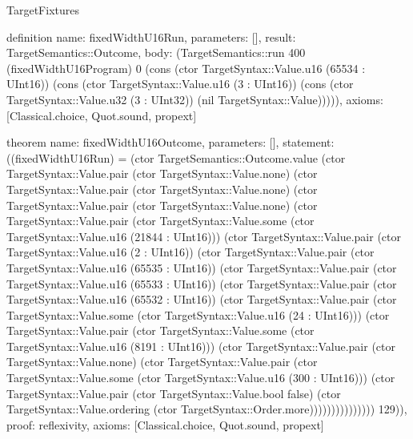 \begin{lexlean}{TargetFixtures}
\begin{semanticmodule}
definition{
  name: fixedWidthU16Run,
  parameters: [],
  result: TargetSemantics::Outcome,
  body: (TargetSemantics::run 400 (fixedWidthU16Program) 0 (cons (ctor TargetSyntax::Value.u16 (65534 : UInt16)) (cons (ctor TargetSyntax::Value.u16 (3 : UInt16)) (cons (ctor TargetSyntax::Value.u32 (3 : UInt32)) (nil TargetSyntax::Value))))),
  axioms: [Classical.choice, Quot.sound, propext]
}

theorem{
  name: fixedWidthU16Outcome,
  parameters: [],
  statement: ((fixedWidthU16Run) = (ctor TargetSemantics::Outcome.value (ctor TargetSyntax::Value.pair (ctor TargetSyntax::Value.none) (ctor TargetSyntax::Value.pair (ctor TargetSyntax::Value.none) (ctor TargetSyntax::Value.pair (ctor TargetSyntax::Value.none) (ctor TargetSyntax::Value.pair (ctor TargetSyntax::Value.some (ctor TargetSyntax::Value.u16 (21844 : UInt16))) (ctor TargetSyntax::Value.pair (ctor TargetSyntax::Value.u16 (2 : UInt16)) (ctor TargetSyntax::Value.pair (ctor TargetSyntax::Value.u16 (65535 : UInt16)) (ctor TargetSyntax::Value.pair (ctor TargetSyntax::Value.u16 (65533 : UInt16)) (ctor TargetSyntax::Value.pair (ctor TargetSyntax::Value.u16 (65532 : UInt16)) (ctor TargetSyntax::Value.pair (ctor TargetSyntax::Value.some (ctor TargetSyntax::Value.u16 (24 : UInt16))) (ctor TargetSyntax::Value.pair (ctor TargetSyntax::Value.some (ctor TargetSyntax::Value.u16 (8191 : UInt16))) (ctor TargetSyntax::Value.pair (ctor TargetSyntax::Value.none) (ctor TargetSyntax::Value.pair (ctor TargetSyntax::Value.some (ctor TargetSyntax::Value.u16 (300 : UInt16))) (ctor TargetSyntax::Value.pair (ctor TargetSyntax::Value.bool false) (ctor TargetSyntax::Value.ordering (ctor TargetSyntax::Order.more))))))))))))))) 129)),
  proof: reflexivity{},
  axioms: [Classical.choice, Quot.sound, propext]
}


\end{semanticmodule}
\end{lexlean}
